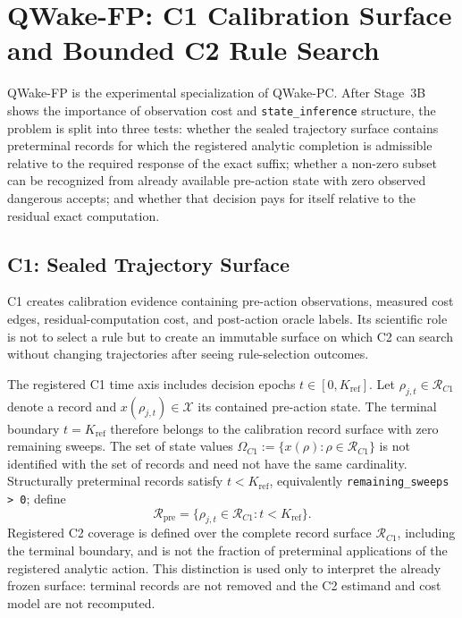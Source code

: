 \section{QWake-FP: C1 Calibration Surface and Bounded C2 Rule Search}
\label{sec:method-qwake-en}

QWake-FP is the experimental specialization of QWake-PC. After Stage~3B shows the
importance of observation cost and \texttt{state\_inference} structure, the problem
is split into three tests: whether the sealed trajectory surface contains preterminal
records for which the registered analytic completion is admissible relative to the
required response of the exact suffix; whether a non-zero subset can be recognized
from already available pre-action state with zero observed dangerous accepts; and
whether that decision pays for itself relative to the residual exact computation.

\subsection{C1: Sealed Trajectory Surface}

C1 creates calibration evidence containing pre-action observations, measured cost
edges, residual-computation cost, and post-action oracle labels. Its scientific role
is not to select a rule but to create an immutable surface on which C2 can search
without changing trajectories after seeing rule-selection outcomes.

The registered C1 time axis includes decision epochs \(t\in[0,K_{\mathrm{ref}}]\).
Let \(\rho_{j,t}\in\mathcal R_{C1}\) denote a record and
\(x(\rho_{j,t})\in\mathcal X\) its contained pre-action state. The terminal boundary
\(t=K_{\mathrm{ref}}\) therefore belongs to the calibration record surface with zero
remaining sweeps. The set of state values
\(\Omega_{C1}:=\{x(\rho):\rho\in\mathcal R_{C1}\}\) is not identified with the set
of records and need not have the same cardinality. Structurally preterminal records
satisfy \(t<K_{\mathrm{ref}}\), equivalently
\texttt{remaining\_sweeps > 0}; define
\[
  \mathcal R_{\mathrm{pre}}
  =\{\rho_{j,t}\in\mathcal R_{C1}:t<K_{\mathrm{ref}}\}.
\]
Registered C2 coverage is defined over the complete record surface
\(\mathcal R_{C1}\), including the terminal boundary, and is not the fraction of
preterminal applications of the registered analytic action. This distinction is used
only to interpret the already frozen surface: terminal records are not removed and the
C2 estimand and cost model are not recomputed.

